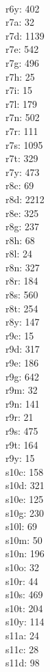 \begin{multicols}{8}
  \\ r6y: 402
  \\ r7a: 32
  \\ r7d: 1139
  \\ r7e: 542
  \\ r7g: 496
  \\ r7h: 25
  \\ r7i: 15
  \\ r7l: 179
  \\ r7n: 502
  \\ r7r: 111
  \\ r7s: 1095
  \\ r7t: 329
  \\ r7y: 473
  \\ r8c: 69
  \\ r8d: 2212
  \\ r8e: 325
  \\ r8g: 237
  \\ r8h: 68
  \\ r8l: 24
  \\ r8n: 327
  \\ r8r: 184
  \\ r8s: 560
  \\ r8t: 254
  \\ r8y: 147
  \\ r9c: 15
  \\ r9d: 317
  \\ r9e: 186
  \\ r9g: 642
  \\ r9m: 32
  \\ r9n: 141
  \\ r9r: 21
  \\ r9s: 475
  \\ r9t: 164
  \\ r9y: 15
  \\ s10c: 158
  \\ s10d: 321
  \\ s10e: 125
  \\ s10g: 230
  \\ s10l: 69
  \\ s10m: 50
  \\ s10n: 196
  \\ s10o: 32
  \\ s10r: 44
  \\ s10s: 469
  \\ s10t: 204
  \\ s10y: 114
  \\ s11a: 24
  \\ s11c: 28
  \\ s11d: 98

\end{multicols}
